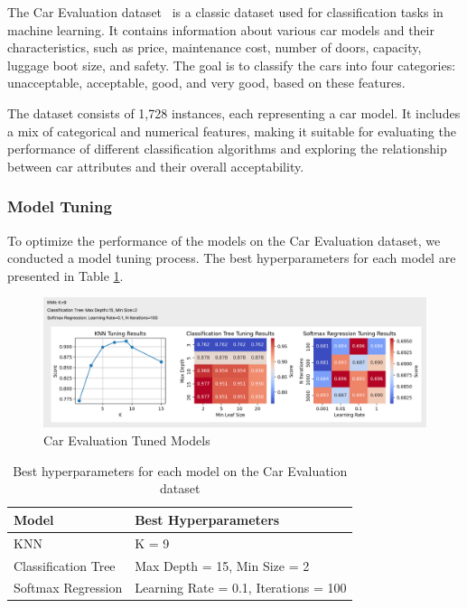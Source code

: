 \documentclass[letterpaper,10pt]{article}
\begin{document}
The Car Evaluation dataset~\cite{misc_car_evaluation_19} is a classic dataset used for classification tasks in machine learning. It contains information about various car models and their characteristics, such as price, maintenance cost, number of doors, capacity, luggage boot size, and safety. The goal is to classify the cars into four categories: unacceptable, acceptable, good, and very good, based on these features.

The dataset consists of 1,728 instances, each representing a car model. It includes a mix of categorical and numerical features, making it suitable for evaluating the performance of different classification algorithms and exploring the relationship between car attributes and their overall acceptability.

\subsubsection{Model Tuning}

To optimize the performance of the models on the Car Evaluation dataset, we conducted a model tuning process. The best hyperparameters for each model are presented in Table \ref{tab:car_tuning}.

\begin{figure}[ht]
    \centering
    \includegraphics[width=1.0\textwidth]{car_eval_tuned.png}
    \caption{Car Evaluation Tuned Models}
    \label{car_eval_tuned}
\end{figure}

\begin{table}[ht]
\centering
\caption{Best hyperparameters for each model on the Car Evaluation dataset}
\label{tab:car_tuning}
\begin{tabular}{|l|l|}
\hline
\textbf{Model} & \textbf{Best Hyperparameters} \\
\hline
KNN & K = 9 \\
\hline
Classification Tree & Max Depth = 15, Min Size = 2 \\
\hline
Softmax Regression & Learning Rate = 0.1, Iterations = 100 \\
\hline
\end{tabular}
\end{table}
\end{document}

